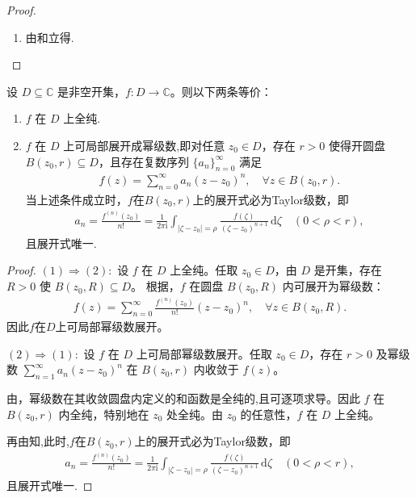 \documentclass[../../main.tex]{subfiles}%
\begin{document}
\begin{proof}
\begin{enumerate}[(1)]
\item 由和立得.
\end{enumerate}

\end{proof}

\begin{theorem}\label{theorem:可幂级数展开等价函数解析}
设 $D \subseteq \mathbb{C}$ 是非空开集，$f: D \to \mathbb{C}$。则以下两条等价：
\begin{enumerate}[(1)]
\item $f$ 在 $D$ 上全纯.

\item $f$ 在 $D$ 上可局部展开成幂级数,即对任意 $z_0 \in D$，存在 $r > 0$ 使得开圆盘 $B(z_0, r) \subseteq D$，且存在复数序列 $\{a_n\}_{n=0}^{\infty}$ 满足
\begin{align*}
f(z) = \sum_{n=0}^{\infty} a_n (z - z_0)^n, \quad \forall z \in B(z_0, r).
\end{align*}
当上述条件成立时，$f$在$B(z_0,r)$上的展开式必为Taylor级数，即
\begin{align*}
a_n = \frac{f^{(n)}(z_0)}{n!} = \frac{1}{2\pi \mathrm{i}} \int_{|\zeta - z_0| = \rho} \frac{f(\zeta)}{(\zeta - z_0)^{n+1}} \, \mathrm{d}\zeta \quad (0 < \rho < r),
\end{align*}
且展开式唯一.
\end{enumerate}
\end{theorem}
\begin{proof}

$(1) \Rightarrow (2):$
设 $f$ 在 $D$ 上全纯。任取 $z_0 \in D$，由 $D$ 是开集，存在 $R > 0$ 使 $B(z_0, R) \subseteq D$。  
根据，$f$ 在圆盘 $B(z_0, R)$ 内可展开为幂级数：
\begin{align*}
f(z) = \sum_{n=0}^{\infty} \frac{f^{(n)}(z_0)}{n!} (z - z_0)^n, \quad \forall z \in B(z_0, R).
\end{align*}
因此$f$在$D$上可局部幂级数展开。

$(2) \Rightarrow (1):$
设 $f$ 在 $D$ 上可局部幂级数展开。任取 $z_0 \in D$，存在 $r > 0$ 及幂级数 $\sum_{n=1}^{\infty} a_n (z - z_0)^n$ 在 $B(z_0, r)$ 内收敛于 $f(z)$。

由，幂级数在其收敛圆盘内定义的和函数是全纯的,且可逐项求导。因此 $f$ 在 $B(z_0, r)$ 内全纯，特别地在 $z_0$ 处全纯。由 $z_0$ 的任意性，$f$ 在 $D$ 上全纯。

再由知,此时,$f$在$B(z_0,r)$上的展开式必为Taylor级数，即
\begin{align*}
a_n = \frac{f^{(n)}(z_0)}{n!} = \frac{1}{2\pi \mathrm{i}} \int_{|\zeta - z_0| = \rho} \frac{f(\zeta)}{(\zeta - z_0)^{n+1}} \, \mathrm{d}\zeta \quad (0 < \rho < r),
\end{align*}
且展开式唯一.

\end{proof}
\end{document}
